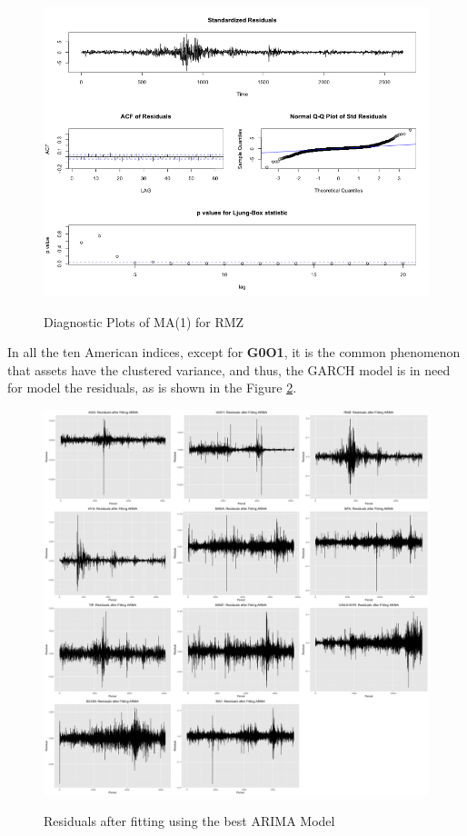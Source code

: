\documentclass[12pt]{article}
\begin{document}
\begin{figure}
  \caption{Diagnostic Plots of MA(1) for RMZ}
  \includegraphics[width = \textwidth]{../results/DiagnosticRMZ}
  \label{fig:DiagnosticRMZ}
\end{figure}

In all the ten American indices, except for \textbf{G0O1}, it is the common phenomenon that assets have the clustered variance, and thus, the GARCH model is in need for model the residuals, as is shown in the Figure \ref{fig:DiagnosticResids}.

\begin{figure}
  \caption{Residuals after fitting using the best ARIMA Model}
  \includegraphics[width = \textwidth]{../results/resids}
  \label{fig:DiagnosticResids}
\end{figure}
\end{document}
